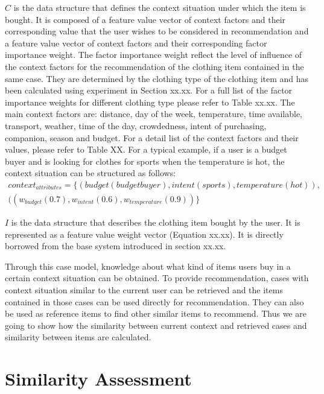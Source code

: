 $C$ is the data structure that defines the context situation under which the item is bought. It is composed of a feature value vector of context factors and their corresponding value that the user wishes to be considered in recommendation and a feature value vector of context factors and their corresponding factor importance weight. The factor importance weight reflect the level of influence of the context factors for the recommendation of the clothing item contained in the same case. They are determined by the clothing type of the clothing item and has been calculated using experiment in Section xx.xx. For a full list of the factor importance weights for different clothing type please refer to Table xx.xx. The main context factors are: distance, day of the week, temperature, time available, transport, weather, time of the day, crowdedness, intent of purchasing, companion, season and budget. For a detail list of the context factors and their values, please refer to Table XX. For a typical example, if a user is a budget buyer and is looking for clothes for sports when the temperature is hot, the context situation can be structured as follows:
\begin{equation} \label{eq:context}
\begin{split}
	{context}_{attributes} = \{(budget (budget buyer), intent (sports), temperature (hot)), &\\
	                                            ((w_{budget}(0.7), w_{intent}(0.6), w_{temperature}(0.9))\} &
\end{split}
\end{equation}

$I$ is the data structure that describes the clothing item bought by the user. It is represented as a feature value weight vector (Equation xx.xx). It is directly borrowed from the base system introduced in section xx.xx. 

Through this case model, knowledge about what kind of items users buy in a certain context situation can be obtained. To provide recommendation, cases with context situation similar to the current user can be retrieved and the items contained in those cases can be used directly for recommendation. They can also be used as reference items to find other similar items to recommend. Thus we are going to show how the similarity between current context and retrieved cases and similarity between items are calculated.

\section{Similarity Assessment} \label{sec:sa}

